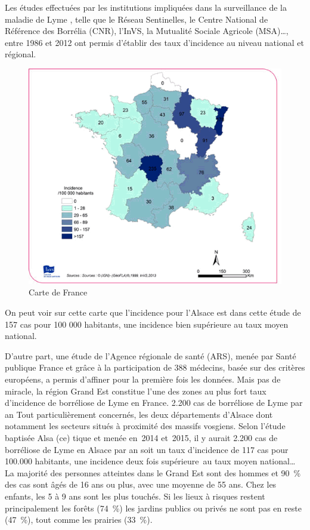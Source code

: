\documentclass[12pt,a4wide]{article}
\begin{document}
Les études effectuées par les institutions impliquées dans la surveillance de la
maladie  de Lyme  ,  telle que  le  Réseau Sentinelles,  le  Centre National  de
Référence  des Borrélia  (CNR), l'InVS,  la Mutualité  Sociale Agricole  (MSA)…,
entre 1986 et 2012 ont permis  d'établir des taux d'incidence au niveau national
et régional.

\begin{figure}[htb]
\centering
\includegraphics[width=.6\linewidth]{./img/carte_lyme.png}
\caption{Carte de France}
\end{figure}




On peut voir sur cette carte que l'incidence pour l'Alsace est dans cette étude de 157 cas pour 100 000 habitants, une incidence bien supérieure au taux moyen national.



D'autre part,  une étude de l'Agence  régionale de santé (ARS),  menée par Santé
publique  France et  grâce à  la participation  de 388  médecins, basée  sur des
critères européens, a permis d'affiner pour  la première fois les données. Mais
pas de miracle, la région Grand Est  constitue l'une des zones au plus fort taux
d'incidence de  borréliose de Lyme en  France.  2.200 cas de  borréliose de Lyme
par  an Tout  particulièrement concernés,  les deux  départements d'Alsace  dont
notamment les  secteurs situés à  proximité des massifs vosgiens.  Selon l'étude
baptisée Alsa  (ce) tique  et menée en 2014  et 2015, il y  aurait 2.200  cas de
borréliose de  Lyme en Alsace par  an soit un  taux d'incidence de 117  cas pour
100.000 habitants, une incidence deux fois supérieure au taux moyen national… La
majorité des personnes atteintes  dans le Grand Est sont des  hommes et 90 \% des
cas sont âgés de  16 ans ou plus, avec une moyenne de  55 ans. Chez les enfants,
les  5  à  9  ans  sont  les  plus touchés.  Si  les  lieux  à  risques  restent
principalement les  forêts (74 \%) les jardins  publics ou privés ne  sont pas en
reste (47 \%), tout comme les prairies (33 \%).
\end{document}
